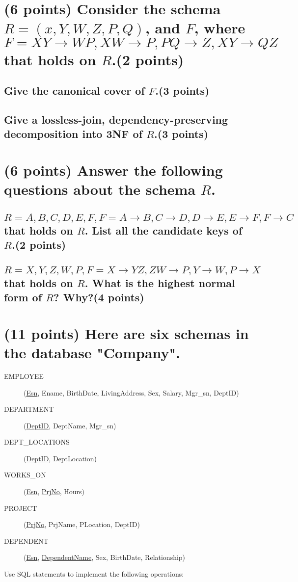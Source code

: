 \documentclass{ctexart}
\begin{document}
\section{(6 points) Consider the schema $R=(x,Y,W,Z,P,Q)$, and $F$, where\newline$F={XY\rightarrow WP,XW\rightarrow P,PQ\rightarrow Z,XY\rightarrow QZ}$ that holds on $R$.\quad(2 points)}
\subsection{Give the canonical cover of $F$.\quad(3 points)}
\subsection{Give a lossless-join, dependency-preserving decomposition into 3NF of $R$.\quad(3 points)}
\section{(6 points) Answer the following questions about the schema $R$.}
\subsection{$R={A,B,C,D,E,F},F={A\rightarrow B,C\rightarrow D,D\rightarrow E,E\rightarrow F,F\rightarrow C}$ that holds on $R$. List all the candidate keys of $R$.\quad(2 points)}
\subsection{$R={X,Y,Z,W,P},F={X\rightarrow YZ,ZW\rightarrow P,Y\rightarrow W,P\rightarrow X}$ that holds on $R$. What is the highest normal form of $R$? Why?\quad(4 points)}
\section{(11 points) Here are six schemas in the database "Company".}
\begin{description}
    \item[EMPLOYEE] (\underline{Esn}, Ename, BirthDate, LivingAddress, Sex, Salary, Mgr\_sn, DeptID)
    \item[DEPARTMENT] (\underline{DeptID}, DeptName, Mgr\_sn)
    \item[DEPT\_LOCATIONS]  (\underline{DeptID}, DeptLocation)
    \item[WORKS\_ON] (\underline{Esn}, \underline{PrjNo}, Hours)
    \item[PROJECT] (\underline{PrjNo}, PrjName, PLocation, DeptID)
    \item[DEPENDENT] (\underline{Esn}, \underline{DependentName}, Sex, BirthDate, Relationship)
\end{description}\par
Use SQL statements to implement the following operations:
\end{document}
